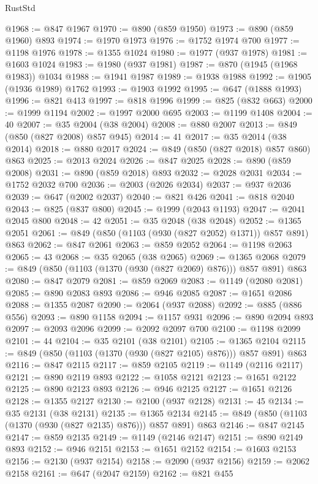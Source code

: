 \begin{lexlean}{RustStd}
\begin{coremodule}
@1968 := @847 @1967
@1970 := @890 (@859 @1950)
@1973 := @890 (@859 @1960) @893
@1974 := @1970 @1973
@1976 := @1752 @1974 @700
@1977 := @1198 @1976
@1978 := @1355 @1024
@1980 := @1977 (@937 @1978)
@1981 := @1603 @1024
@1983 := @1980 (@937 @1981)
@1987 := @870 (@1945 (@1968 @1983)) @1034
@1988 := @1941 @1987
@1989 := @1938 @1988
@1992 := @1905 (@1936 @1989) @1762
@1993 := @1903 @1992
@1995 := @647 (@1888 @1993)
@1996 := @821 @413
@1997 := @818 @1996
@1999 := @825 (@832 @663)
@2000 := @1999 @1194
@2002 := @1997 @2000 @695
@2003 := @1199 @1408
@2004 := 40
@2007 := @35 @2004 (@38 @2004)
@2008 := @880 @2007
@2013 := @849 (@850 (@827 @2008) @857 @945)
@2014 := 41
@2017 := @35 @2014 (@38 @2014)
@2018 := @880 @2017
@2024 := @849 (@850 (@827 @2018) @857 @860) @863
@2025 := @2013 @2024
@2026 := @847 @2025
@2028 := @890 (@859 @2008)
@2031 := @890 (@859 @2018) @893
@2032 := @2028 @2031
@2034 := @1752 @2032 @700
@2036 := @2003 (@2026 @2034)
@2037 := @937 @2036
@2039 := @647 (@2002 @2037)
@2040 := @821 @426
@2041 := @818 @2040
@2043 := @825 (@837 @800)
@2045 := @1999 (@2043 @1193)
@2047 := @2041 @2045 @800
@2048 := 42
@2051 := @35 @2048 (@38 @2048)
@2052 := @1365 @2051
@2061 := @849 (@850 (@1103 (@930 (@827 @2052) @1371)) @857 @891) @863
@2062 := @847 @2061
@2063 := @859 @2052
@2064 := @1198 @2063
@2065 := 43
@2068 := @35 @2065 (@38 @2065)
@2069 := @1365 @2068
@2079 := @849 (@850 (@1103 (@1370 (@930 (@827 @2069) @876))) @857 @891) @863
@2080 := @847 @2079
@2081 := @859 @2069
@2083 := @1149 (@2080 @2081)
@2085 := @890 @2083 @893
@2086 := @946 @2085
@2087 := @1651 @2086
@2088 := @1355 @2087
@2090 := @2064 (@937 @2088)
@2092 := @885 (@886 @556)
@2093 := @890 @1158
@2094 := @1157 @931
@2096 := @890 @2094 @893
@2097 := @2093 @2096
@2099 := @2092 @2097 @700
@2100 := @1198 @2099
@2101 := 44
@2104 := @35 @2101 (@38 @2101)
@2105 := @1365 @2104
@2115 := @849 (@850 (@1103 (@1370 (@930 (@827 @2105) @876))) @857 @891) @863
@2116 := @847 @2115
@2117 := @859 @2105
@2119 := @1149 (@2116 @2117)
@2121 := @890 @2119 @893
@2122 := @1058 @2121
@2123 := @1651 @2122
@2125 := @890 @2123 @893
@2126 := @946 @2125
@2127 := @1651 @2126
@2128 := @1355 @2127
@2130 := @2100 (@937 @2128)
@2131 := 45
@2134 := @35 @2131 (@38 @2131)
@2135 := @1365 @2134
@2145 := @849 (@850 (@1103 (@1370 (@930 (@827 @2135) @876))) @857 @891) @863
@2146 := @847 @2145
@2147 := @859 @2135
@2149 := @1149 (@2146 @2147)
@2151 := @890 @2149 @893
@2152 := @946 @2151
@2153 := @1651 @2152
@2154 := @1603 @2153
@2156 := @2130 (@937 @2154)
@2158 := @2090 (@937 @2156)
@2159 := @2062 @2158
@2161 := @647 (@2047 @2159)
@2162 := @821 @455

\end{coremodule}
\end{lexlean}
